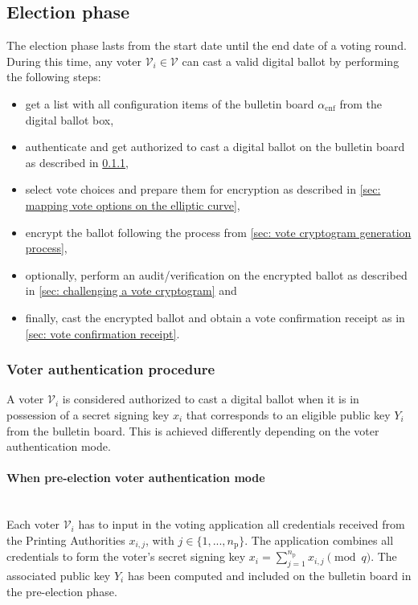 \subsection{Election phase} \label{sec: election phase}
The election phase lasts from the start date until the end date of a voting round. During this time, any voter $\mathcal{V}_i \in \boldsymbol{\mathcal{V}}$ can cast a valid digital ballot by performing the following steps:
\begin{itemize}
    \item get a list with all configuration items of the bulletin board $\alpha_\mathrm{cnf}$ from the digital ballot box,
    \item authenticate and get authorized to cast a digital ballot on the bulletin board as described in \cref{sec: voter authentication procedure},
    \item select vote choices and prepare them for encryption as described in \cref{sec: mapping vote options on the elliptic curve},
    \item encrypt the ballot following the process from \cref{sec: vote cryptogram generation process},
    \item optionally, perform an audit/verification on the encrypted ballot as described in \cref{sec: challenging a vote cryptogram} and
    \item finally, cast the encrypted ballot and obtain a vote confirmation receipt as in \cref{sec: vote confirmation receipt}.
\end{itemize}


\subsubsection{Voter authentication procedure} \label{sec: voter authentication procedure}
A voter $\mathcal{V}_i$ is considered authorized to cast a digital ballot when it is in possession of a secret signing key $x_i$ that corresponds to an eligible public key $Y_i$ from the bulletin board. This is achieved differently depending on the voter authentication mode.


\paragraph{When pre-election voter authentication mode}\mbox{}\\
Each voter $\mathcal{V}_i$ has to input in the voting application all credentials received from the Printing Authorities $x_{i, j}$, with $j \in \{ 1, ..., n_\mathrm{p} \}$. The application combines all credentials to form the voter's secret signing key $x_i = \sum_{j=1}^{n_\mathrm{p}} x_{i, j} \pmod q$. The associated public key $Y_i$ has been computed and included on the bulletin board in the pre-election phase.


